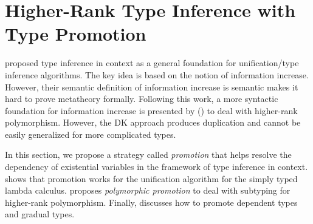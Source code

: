 \chapter{Higher-Rank Type Inference with Type Promotion}
\label{chap:Promotion}

\cite{gundry2010type} proposed type inference in context as a general foundation
for unification/type inference algorithms. The key idea is based on the notion
of information increase. However, their semantic definition of information
increase is semantic makes it hard to prove metatheory formally. Following this
work, a more syntactic foundation for information increase is presented by
\cite{DK} () to deal with higher-rank polymorphism. However, the
DK approach produces duplication and cannot be easily generalized for more
complicated types.

In this section, we propose a strategy called \textit{promotion} that helps
resolve the dependency of existential variables in the framework of type
inference in context.  shows that promotion works for the
unification algorithm for the simply typed lambda calculus.
 proposes \textit{polymorphic promotion} to deal with
subtyping for higher-rank polymorphism. Finally, 
discusses how to promote dependent types and gradual types.







